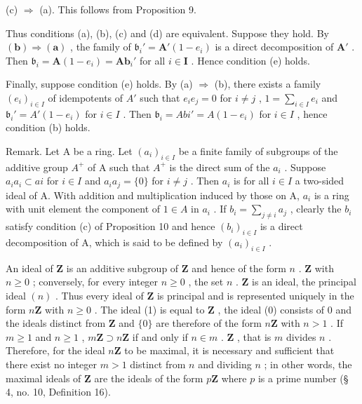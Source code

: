 (c) \(\Rightarrow\) (a). This follows from Proposition 9.

Thus conditions (a), (b), (c) and (d) are equivalent. Suppose they hold. By \((\mathbf{b}) \Rightarrow (\mathbf{a})\) , the family of \(\mathfrak{b}_i' = \mathbf{A}'(1 - e_i)\) is a direct decomposition of \(\mathbf{A}'\) . Then \(\mathfrak{b}_i = \mathbf{A}(1 - e_i) = \mathbf{Ab}_i'\) for all \(i \in \mathbf{I}\) . Hence condition (e) holds.

Finally, suppose condition (e) holds. By (a) \(\Rightarrow\) (b), there exists a family \((e_i)_{i\in I}\) of idempotents of \(A'\) such that \(e_i e_j = 0\) for \(i \neq j\) , \(1 = \sum_{i\in I} e_i\) and \(\mathfrak{b}_i' = A'(1 - e_i)\) for \(i \in I\) . Then \(\mathfrak{b}_i = Abi' = A(1 - e_i)\) for \(i \in I\) , hence condition (b) holds.

Remark. Let A be a ring. Let \((a_{i})_{i\in I}\) be a finite family of subgroups of the additive group \(A^{+}\) of A such that \(A^{+}\) is the direct sum of the \(a_{i}\) . Suppose \(a_{i}a_{i}\subset ai\) for \(i\in I\) and \(a_{i}a_{j} = \{0\}\) for \(i\neq j\) . Then \(a_{i}\) is for all \(i\in I\) a two-sided ideal of A. With addition and multiplication induced by those on A, \(a_{i}\) is a ring with unit element the component of \(1\in A\) in \(a_{i}\) . If \(b_{i} = \sum_{j\neq i}a_{j}\) , clearly the \(b_{i}\) satisfy condition (c) of Proposition 10 and hence \((b_{i})_{i\in I}\) is a direct decomposition of A, which is said to be defined by \((a_{i})_{i\in I}\) .


An ideal of \(\mathbf{Z}\) is an additive subgroup of \(\mathbf{Z}\) and hence of the form \(n\) . \(\mathbf{Z}\) with \(n \geqslant 0\) ; conversely, for every integer \(n \geqslant 0\) , the set \(n\) . \(\mathbf{Z}\) is an ideal, the principal ideal \((n)\) . Thus every ideal of \(\mathbf{Z}\) is principal and is represented uniquely in the form \(n\mathbf{Z}\) with \(n \geqslant 0\) . The ideal (1) is equal to \(\mathbf{Z}\) , the ideal (0) consists of 0 and the ideals distinct from \(\mathbf{Z}\) and \(\{0\}\) are therefore of the form \(n\mathbf{Z}\) with \(n > 1\) . If \(m \geqslant 1\) and \(n \geqslant 1\) , \(m\mathbf{Z} \supset n\mathbf{Z}\) if and only if \(n \in m\) . \(\mathbf{Z}\) , that is \(m\) divides \(n\) . Therefore, for the ideal \(n\mathbf{Z}\) to be maximal, it is necessary and sufficient that there exist no integer \(m > 1\) distinct from \(n\) and dividing \(n\) ; in other words, the maximal ideals of \(\mathbf{Z}\) are the ideals of the form \(p\mathbf{Z}\) where \(p\) is a prime number (§ 4, no. 10, Definition 16).

